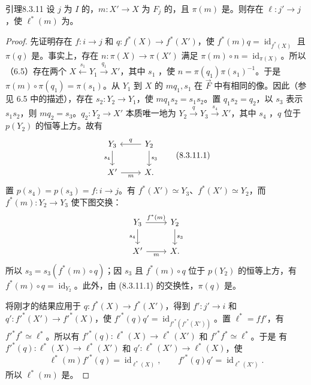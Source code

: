 \begin{SGAresult}{引理}{8.3.11}
设 $j$ 为 $I$ 的，$m:X'\to X$ 为 $F_j$ 的，且 $\pi(m)$ 是。则存在 $\ell:j'\to j$，使 $\ell^*(m)$ 为。
\end{SGAresult}
\begin{proof}
先证明存在 $f:i\to j$ 和 $q:f^*(X)\to f^*(X')$，使 $f^*(m)q=\operatorname{id}_{f^*(X)}$ 且 $\pi(q)$ 是。事实上，存在 $n:\pi(X)\to\pi(X')$ 满足 $\pi(m)\circ n=\operatorname{id}_{\pi(X)}$。所以（6.5）存在两个 $X\xleftarrow{s_1}Y_1\xrightarrow{q_1}X'$，其中 $s_1$ ，使 $n=\pi(q_1)\pi(s_1)^{-1}$。于是 $\pi(m)\circ\pi(q_1)=\pi(s_1)$。从 $Y_1$ 到 $X$ 的 $mq_1,s_1$ 在 $\overrightarrow F$ 中有相同的像。因此（参见 6.5 中的描述），存在 $s_2:Y_2\to Y_1$，使 $mq_1s_2=s_1s_2$。置 $q_1s_2=q_2$，以 $s_3$ 表示 $s_1s_2$，则 $mq_2=s_3$。$q_2:Y_2\to X'$ 本质唯一地为 $Y_2\xrightarrow qY_3\xrightarrow{s_4}X'$，其中 $s_4$ ，$q$ 位于 $p(Y_2)$ 的恒等上方。故有
\[\begin{tikzcd}
Y_3\arrow[d,"s_4"']&Y_2\arrow[l,"q"']\arrow[d,"s_3"]\\
X'\arrow[r,"m"']&X.
\end{tikzcd}\tag{8.3.11.1}\]
置 $p(s_4)=p(s_3)=f:i\to j$。有 $f^*(X')\simeq Y_3$、$f^*(X')\simeq Y_2$，而 $f^*(m):Y_2\to Y_3$ 使下图交换：
\[\begin{tikzcd}
Y_3\arrow[r,"f^*(m)"]\arrow[d,"s_4"']&Y_2\arrow[d,"s_3"]\\
X'\arrow[r,"m"']&X.
\end{tikzcd}\]
所以 $s_3=s_3(f^*(m)\circ q)$；因 $s_3$ 且 $f^*(m)\circ q$ 位于 $p(Y_2)$ 的恒等上方，有 $f^*(m)\circ q=\operatorname{id}_{Y_2}$。此外，由 (8.3.11.1) 的交换性，$\pi(q)$ 是。

将刚才的结果应用于 $q:f^*(X)\to f^*(X')$，得到 $f':j'\to i$ 和 $q':f'^*(X')\to f'^*(X)$，使 $f'^*(q)q'=\operatorname{id}_{f'^*(f'^*(X'))}$。置 $\ell^*=ff'$，有 $f'^*f^*\simeq\ell^*$。所以有 $f'^*(q):\ell^*(X)\to\ell^*(X')$ 和 $f'^*f^*\simeq\ell^*$。于是
有 $f'^*(q):\ell^*(X)\to\ell^*(X')$ 和 $q':\ell^*(X')\to\ell^*(X)$，使
\[\ell^*(m)f'^*(q)=\operatorname{id}_{\ell^*(X)},\qquad f'^*(q)q'=\operatorname{id}_{\ell^*(X')}.\]
所以 $\ell^*(m)$ 是。
\end{proof}
